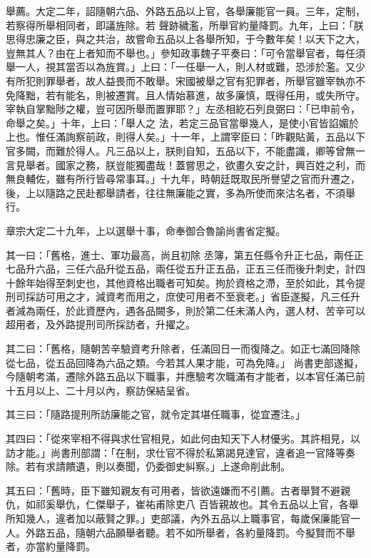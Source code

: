 \begin{pinyinscope}
 舉薦。大定二年，詔隨朝六品、外路五品以上官，各舉廉能官一員。三年，定制，若察得所舉相同者，即議旌除。若
 聲跡穢濫，所舉官約量降罰。九年，上曰：「朕思得忠廉之臣，與之共治，故嘗命五品以上各舉所知，于今數年矣！以天下之大，豈無其人？由在上者知而不舉也。」參知政事魏子平奏曰：「可令當舉官者，每任須舉一人，視其當否以為旌賞。」上曰：「一任舉一人，則人材或難，恐涉於濫。又少有所犯則罪舉者，故人益畏而不敢舉。宋國被舉之官有犯罪者，所舉官雖宰執亦不免降黜，若有能名，則被遷賞。且人情始慕進，故多廉慎，既得任用，或失所守。宰執自掌黜陟之權，豈可因所舉而置罪耶？」左丞相紇石列良弼曰：「已申前令，命舉之矣。」十年，上曰：「舉人之
 法，若定三品官當舉幾人，是使小官皆諂媚於上也。惟任滿詢察前政，則得人矣。」十一年，上謂宰臣曰：「昨觀貼黃，五品以下官多闕，而難於得人。凡三品以上，朕則自知，五品以下，不能盡識，卿等曾無一言見舉者。國家之務，朕豈能獨盡哉！蓋嘗思之，欲畫久安之計，興百姓之利，而無良輔佐，雖有所行皆尋常事耳。」十九年，時朝廷既取民所譽望之官而升遷之，後，上以隨路之民赴都舉請者，往往無廉能之實，多為所使而來沽名者，不須舉行。



 章宗大定二十九年，上以選舉十事，命奉御合魯諭尚書省定擬。



 其一曰：「舊格，進士、軍功最高，尚且初除
 丞簿，第五任縣令升正七品，兩任正七品升六品，三任六品升從五品，兩任從五升正五品，正五三任而後升刺史，計四十餘年始得至刺史也，其他資格出職者可知矣。拘於資格之滯，至於如此，其令提刑司採訪可用之才，減資考而用之，庶使可用者不至衰老。」省臣遂擬，凡三任升者減為兩任，於此資歷內，遇各品闕多，則於第二任未滿人內，選人材、苦辛可以超用者，及外路提刑司所採訪者，升擢之。



 其二曰：「舊格，隨朝苦辛驗資考升除者，任滿回日一而復降之。如正七滿回降除從七品，從五品回降為六品之類。今若其人果才能，可為免降。」
 尚書吏部遂擬，今隨朝考滿，遷除外路五品以下職事，并應驗考次職滿有才能者，以本官任滿已前十五月以上、二十月以內，察訪保結呈省。



 其三曰：「隨路提刑所訪廉能之官，就令定其堪任職事，從宜遷注。」



 其四曰：「從來宰相不得與求仕官相見，如此何由知天下人材優劣。其許相見，以訪才能。」尚書刑部謂：「在制，求仕官不得於私第謁見達官，違者追一官降等奏除。若有求請饋遺，則以奏聞，仍委御史糾察。」上遂命削此制。



 其五曰：「舊時，臣下雖知親友有可用者，皆欲遠嫌而不引薦。古者舉賢不避親仇，如祁奚舉仇，仁傑舉子，崔祐甫除吏八
 百皆親故也。其令五品以上官，各舉所知幾人，違者加以蔽賢之罪。」吏部議，內外五品以上職事官，每歲保廉能官一人。外路五品，隨朝六品願舉者聽。若不如所舉者，各約量降罰。今擬賢而不舉者，亦當約量降罰。




\end{pinyinscope}

